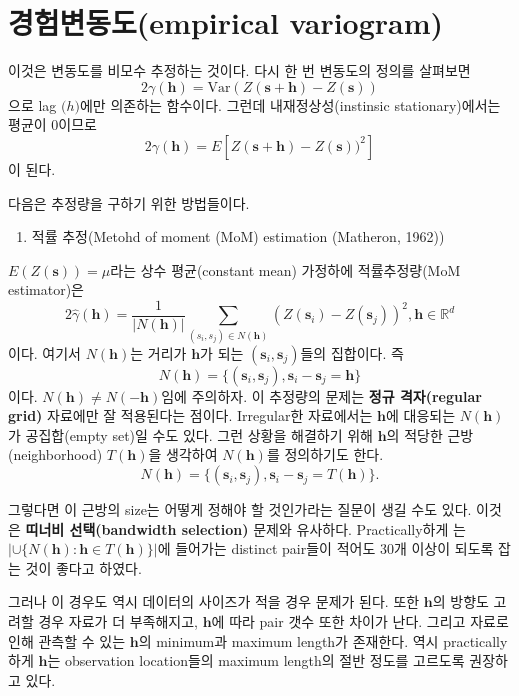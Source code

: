 \documentclass[b5paper,]{scrbook}
\providecommand{\tightlist}{%
  \setlength{\itemsep}{0pt}\setlength{\parskip}{0pt}}
\theoremstyle{plain}
\theoremstyle{definition}
\numberwithin{equation}{section}
\begin{document}
\section{경험변동도(empirical variogram)}\label{empirical-variogram}

이것은 변동도를 비모수 추정하는 것이다. 다시 한 번 변동도의 정의를
살펴보면
\[2\gamma(\mathbf{h})=\text{Var}(Z(\mathbf{s}+\mathbf{h})-Z(\mathbf{s}))\]
으로 lag \(\mathbf(h)\)에만 의존하는 함수이다. 그런데
내재정상성(instinsic stationary)에서는 평균이 0이므로
\[2\gamma(\mathbf{h})=E[Z(\mathbf{s}+\mathbf{h})-Z(\mathbf{s}))^{2}]\]
이 된다.

다음은 추정량을 구하기 위한 방법들이다.

\begin{enumerate}
\def\labelenumi{\arabic{enumi}.}
\tightlist
\item
  적률 추정(Metohd of moment (MoM) estimation (Matheron, 1962))
\end{enumerate}

\(E(Z(\mathbf{s}))=\mu\)라는 상수 평균(constant mean) 가정하에
적률추정량(MoM estimator)은
\[2\hat{\gamma}(\mathbf{h})=\frac{1}{|N(\mathbf{h})|}\sum_{(s_{i},s_{j})\in N(\mathbf{h})}(Z(\mathbf{s}_{i})-Z(\mathbf{s}_{j}))^{2}, \mathbf{h}\in \mathbb{R}^{d}\]
이다. 여기서 \(N(\mathbf{h})\)는 거리가 \(\mathbf{h}\)가 되는
\((\mathbf{s}_{i},\mathbf{s}_{j})\)들의 집합이다. 즉
\[N(\mathbf{h})=\{ (\mathbf{s}_{i},\mathbf{s}_{j}), \mathbf{s}_{i}-\mathbf{s}_{j}=\mathbf{h} \}\]
이다. \(N(\mathbf{h}) \neq N(\mathbf{-h})\)임에 주의하자. 이 추정량의
문제는 \textbf{정규 격자(regular grid)} 자료에만 잘 적용된다는 점이다.
Irregular한 자료에서는 \(\mathbf{h}\)에 대응되는 \(N(\mathbf{h})\)가
공집합(empty set)일 수도 있다. 그런 상황을 해결하기 위해
\(\mathbf{h}\)의 적당한 근방(neighborhood) \(T(\mathbf{h})\)을 생각하여
\(N(\mathbf{h})\)를 정의하기도 한다.
\[N(\mathbf{h})=\{ (\mathbf{s}_{i},\mathbf{s}_{j}), \mathbf{s}_{i}-\mathbf{s}_{j}=T(\mathbf{h}) \} .\]

그렇다면 이 근방의 size는 어떻게 정해야 할 것인가라는 질문이 생길 수도
있다. 이것은 \textbf{띠너비 선택(bandwidth selection)} 문제와 유사하다.
Practically하게 \citep{Journel2003}는
\(| \cup \{N(\mathbf{h}): \mathbf{h} \in T(\mathbf{h}) \} |\)에 들어가는
distinct pair들이 적어도 30개 이상이 되도록 잡는 것이 좋다고 하였다.

그러나 이 경우도 역시 데이터의 사이즈가 적을 경우 문제가 된다. 또한
\(\mathbf{h}\)의 방향도 고려할 경우 자료가 더 부족해지고,
\(\mathbf{h}\)에 따라 pair 갯수 또한 차이가 난다. 그리고 자료로 인해
관측할 수 있는 \(\mathbf{h}\)의 minimum과 maximum length가 존재한다.
역시 practically하게 \(\mathbf{h}\)는 observation location들의 maximum
length의 절반 정도를 고르도록 권장하고 있다.
\end{document}

